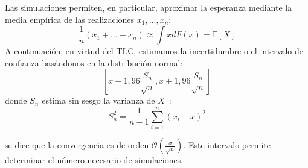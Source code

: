%
%	
%	
%	
%	
%	
%	
%	
%	
%	

\begin{f}
	
	Las simulaciones permiten, en particular, aproximar la esperanza mediante la media empírica de las realizaciones \(x_1,\ldots,x_n\):
	\[
	\frac{1}{n}(x_1+\ldots+x_n)\approx \int xdF(x)=\mathbb{E}[X]
	\]
	A continuación, en virtud del TLC, estimamos la incertidumbre o el intervalo de confianza basándonos en la distribución normal:
	\[
	\left[\overline{x}-1,96\frac{S_n}{\sqrt{n}},\overline{x}+1,96\frac{S_n}{\sqrt{n}}\right]
	\]
	donde \(S_n\) estima sin sesgo la varianza de \(X\)~:
	\[
	S_n^2=\frac{1}{n-1}\sum_{i=1}^{n}(x_i-\overline{x})^2
	\]
	
se dice que la convergencia es de orden \(\mathcal{O}(\frac{\sigma}{\sqrt{n}})\). 
Este intervalo permite determinar el número necesario de simulaciones.

\end{f}

